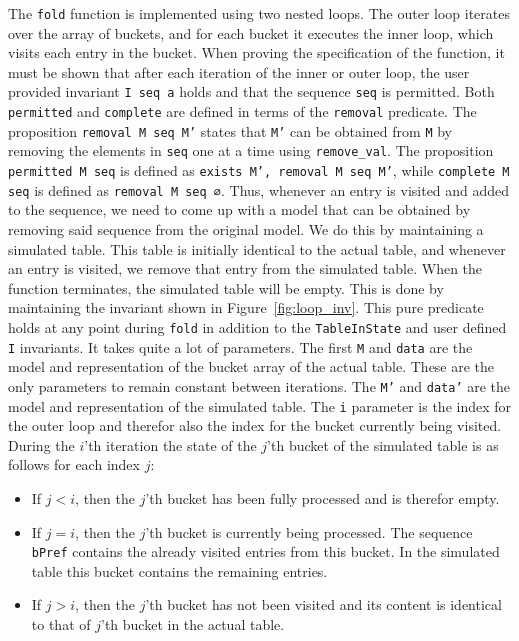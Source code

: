 \documentclass[10pt,a4paper]{article}
\begin{document}
The \texttt{fold} function is implemented using two nested loops. The outer loop iterates over the array of buckets, and for each bucket it executes the inner loop, which visits each entry in the bucket. When proving the specification of the function, it must be shown that after each iteration of the inner or outer loop, the user provided invariant \texttt{I seq a} holds and that the sequence \texttt{seq} is permitted. Both \texttt{permitted} and \texttt{complete} are defined in terms of the \texttt{removal} predicate. The proposition \texttt{removal M seq M'} states that \texttt{M'} can be obtained from \texttt{M} by removing the elements in \texttt{seq} one at a time using \texttt{remove\_val}. The proposition \texttt{permitted M seq} is defined as \texttt{exists M', removal M seq M'}, while \texttt{complete M seq} is defined as \texttt{removal M seq ∅}. Thus, whenever an entry is visited and added to the sequence, we need to come up with a model that can be obtained by removing said sequence from the original model. We do this by maintaining a simulated table. This table is initially identical to the actual table, and whenever an entry is visited, we remove that entry from the simulated table. When the function terminates, the simulated table will be empty. This is done by maintaining the invariant shown in Figure~\ref{fig:loop_inv}. This pure predicate holds at any point during \texttt{fold} in addition to the \texttt{TableInState} and user defined \texttt{I} invariants. It takes quite a lot of parameters. The first \texttt{M} and \texttt{data} are the model and representation of the bucket array of the actual table. These are the only parameters to remain constant between iterations. The \texttt{M'} and \texttt{data'} are the model and representation of the simulated table. The \texttt{i} parameter is the index for the outer loop and therefor also the index for the bucket currently being visited. During the $i$'th iteration the state of the $j$'th bucket of the simulated table is as follows for each index $j$:
\begin{itemize}
\item If $j < i$, then the $j$'th bucket has been fully processed and is therefor empty.
\item If $j = i$, then the $j$'th bucket is currently being processed. The sequence \texttt{bPref} contains the already visited entries from this bucket. In the simulated table this bucket contains the remaining entries.
\item If $j > i$, then the $j$'th bucket has not been visited and its content is identical to that of $j$'th bucket in the actual table.
\end{itemize}
\end{document}
